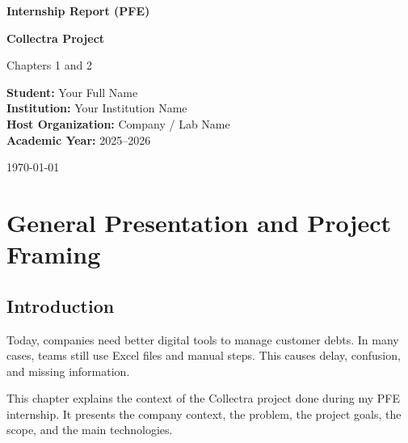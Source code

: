 \documentclass[12pt,a4paper]{report}
\begin{document}
\begin{titlepage}
  \centering

  \begin{minipage}{0.45\textwidth}
    \centering
  \end{minipage}
  \hfill
  \begin{minipage}{0.45\textwidth}
    \centering
  \end{minipage}

  \vspace{2.2cm}
  {\fontsize{16pt}{20pt}\selectfont \textbf{Internship Report (PFE)}\par}
  \vspace{1cm}
  {\fontsize{16pt}{20pt}\selectfont \textbf{Collectra Project}\par}
  \vspace{0.6cm}
  {\fontsize{14pt}{18pt}\selectfont Chapters 1 and 2\par}

  \vfill

  \begin{flushleft}
    \textbf{Student:} Your Full Name \\
    \textbf{Institution:} Your Institution Name \\
    \textbf{Host Organization:} Company / Lab Name \\
    \textbf{Academic Year:} 2025--2026
  \end{flushleft}

  \vfill
  {\large \today\par}
\end{titlepage}

\tableofcontents
\clearpage

\chapter{General Presentation and Project Framing}
\label{chap:general-presentation}

\section*{Introduction}
Today, companies need better digital tools to manage customer debts. In many cases, teams still use Excel files and manual steps. This causes delay, confusion, and missing information.

This chapter explains the context of the Collectra project done during my PFE internship. It presents the company context, the problem, the project goals, the scope, and the main technologies.
\end{document}

